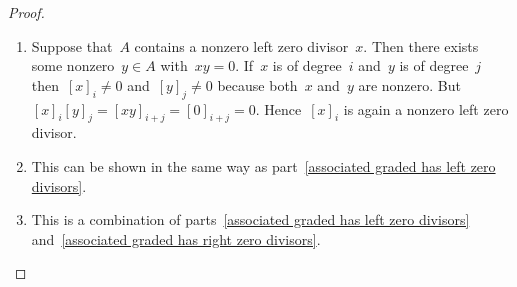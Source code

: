 \begin{proof}
  \leavevmode
  \begin{enumerate}
    \item
      Suppose that~$A$ contains a nonzero left zero divisor~$x$.
      Then there exists some nonzero~$y \in A$ with~$xy = 0$.
      If~$x$ is of degree~$i$ and~$y$ is of degree~$j$ then~$[x]_i \neq 0$ and~$[y]_j \neq 0$ because both~$x$ and~$y$ are nonzero.
      But~$[x]_i [y]_j = [xy]_{i+j} = [0]_{i+j} = 0$.
      Hence~$[x]_i$ is again a nonzero left zero divisor.
    \item
      This can be shown in the same way as part~\ref*{associated graded has left zero divisors}.
    \item
      This is a combination of parts~\ref*{associated graded has left zero divisors} and~\ref*{associated graded has right zero divisors}.
    \qedhere
  \end{enumerate}
\end{proof}



